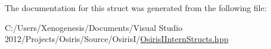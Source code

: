 The documentation for this struct was generated from the following file\-:\begin{DoxyCompactItemize}
\item 
C\-:/\-Users/\-Xenogenesis/\-Documents/\-Visual Studio 2012/\-Projects/\-Osiris/\-Source/\-Osiris\-I/\hyperlink{_osiris_i_intern_structs_8hpp}{Osiris\-I\-Intern\-Structs.\-hpp}\end{DoxyCompactItemize}

